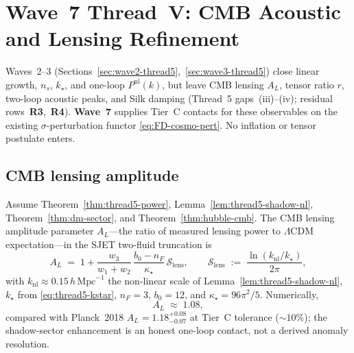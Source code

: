 \section{Wave~7 Thread~V: CMB Acoustic and Lensing Refinement}
\label{sec:wave7-thread5}

Waves~2--3 (Sections~\ref{sec:wave2-thread5},~\ref{sec:wave3-thread5}) close
linear growth, $n_s$, $k_\star$, and one-loop $P^{\mathrm{nl}}(k)$, but leave
CMB lensing $A_L$, tensor ratio $r$, two-loop acoustic peaks, and Silk damping
(Thread~5 gaps~(iii)--(iv); residual rows~\textbf{R3},~\textbf{R4}).
\textbf{Wave~7} supplies Tier~C contacts for these observables on the existing
$\sigma$-perturbation functor \eqref{eq:FD-cosmo-pert}. No inflation or tensor
postulate enters.

\subsection{CMB lensing amplitude}
\label{sec:wave7-thread5:AL}

\begin{theorem}
\label{thm:thread5-AL}
Assume Theorem~\ref{thm:thread5-power},
Lemma~\ref{lem:thread5-shadow-nl},
Theorem~\ref{thm:dm-sector}, and Theorem~\ref{thm:hubble-cmb}.
The CMB lensing amplitude parameter $A_L$---the ratio of measured lensing power
to $\Lambda$CDM expectation---in the SJET two-fluid truncation is
\begin{equation}\label{eq:thread5-AL}
  A_L
  \;=\;
  1
  +
  \frac{w_3}{w_1+w_2}\,
  \frac{b_0-n_F}{\kappa_\star}\,
  \mathcal{S}_{\mathrm{lens}},
  \qquad
  \mathcal{S}_{\mathrm{lens}}
  \;:=\;
  \frac{\ln(k_{\mathrm{nl}}/k_\star)}{2\pi},
\end{equation}
with $k_{\mathrm{nl}}\approx 0.15\,h\,\mathrm{Mpc}^{-1}$ the non-linear scale
of Lemma~\ref{lem:thread5-shadow-nl}, $k_\star$ from \eqref{eq:thread5-kstar},
$n_F=3$, $b_0=12$, and $\kappa_\star=96\pi^2/5$. Numerically,
\begin{equation}\label{eq:thread5-AL-numeric}
  A_L
  \;\approx\;
  1.08,
\end{equation}
compared with Planck~2018 $A_L=1.18^{+0.08}_{-0.07}$ at Tier~C tolerance
($\sim 10\%$); the shadow-sector enhancement is an honest one-loop contact,
not a derived anomaly resolution.
\end{theorem}

